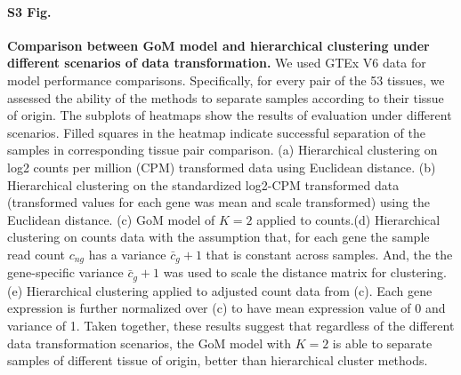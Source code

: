 \documentclass[10pt,letterpaper]{article}
\begin{document}
\paragraph*{S3 Fig.}

\label{figS3}
{\bf Comparison between GoM model and hierarchical clustering under different scenarios of data transformation.} We used GTEx V6 data for model performance comparisons. Specifically, for every pair of the 53 tissues, we assessed the ability of the methods to separate samples according to their tissue of origin. The subplots of heatmaps show the results of evaluation under different scenarios. Filled squares in the heatmap indicate successful separation of the samples in corresponding tissue pair comparison. (a) Hierarchical clustering on log2 counts per million (CPM) transformed data using Euclidean distance. (b) Hierarchical clustering on the standardized log2-CPM transformed data (transformed values for each gene was mean and scale transformed) using the Euclidean distance. (c) GoM model of $K = 2$ applied to counts.(d) Hierarchical clustering on counts data with the assumption that, for each gene the sample read count $c_{ng}$ has a variance $\bar{c}_{g} + 1$ that is constant across samples. And, the the gene-specific variance $\bar{c}_{g} + 1$ was used to scale the distance matrix for clustering.  (e) Hierarchical clustering applied to adjusted count data from (c). Each gene expression is further normalized over (c) to have mean expression value of 0 and variance of 1. Taken together, these results suggest that regardless of the different data transformation scenarios, the GoM model with $K = 2$ is able to separate samples of different tissue of origin, better than hierarchical cluster methods.
\end{document}

